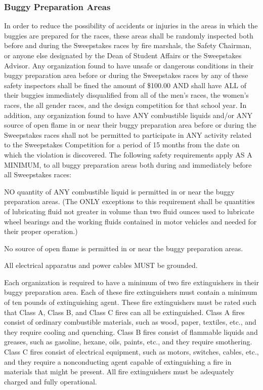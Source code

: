 \subsubsection{Buggy Preparation Areas}
\label{subsec:Buggy Prep}

	In order to reduce the possibility of accidents or injuries in the areas in which the buggies are prepared for the races, these areas shall be randomly inspected both before and during the Sweepstakes races by fire marshals, the Safety Chairman, or anyone else designated by the Dean of Student Affairs or the Sweepstakes Advisor. Any organization found to have unsafe or dangerous conditions in their buggy preparation area before or during the Sweepstakes races by any of these safety inspectors shall be fined the amount of \$100.00 AND shall have ALL of their buggies immediately disqualified from all of the men's races, the women's races, the all gender races, and the design competition for that school year. In addition, any organization found to have ANY combustible liquids and/or ANY source of open flame in or near their buggy preparation area before or during the Sweepstakes races shall not be permitted to participate in ANY activity related to the Sweepstakes Competition for a period of 15 months from the date on which the violation is discovered. The following safety requirements apply AS A MINIMUM, to all buggy preparation areas both during and immediately before all Sweepstakes races:

	NO quantity of ANY combustible liquid is permitted in or near the buggy preparation areas. (The ONLY exceptions to this requirement shall be quantities of lubricating fluid not greater in volume than two fluid ounces used to lubricate wheel bearings and the working fluids contained in motor vehicles and needed for their proper operation.)

	No source of open flame is permitted in or near the buggy preparation areas.

	All electrical apparatus and power cables MUST be grounded.

	Each organization is required to have a minimum of two fire extinguishers in their buggy preparation area. Each of these fire extinguishers must contain a minimum of ten pounds of extinguishing agent. These fire extinguishers must be rated such that Class A, Class B, and Class C fires can all be extinguished. Class A fires consist of ordinary combustible materials, such as wood, paper, textiles, etc., and they require cooling and quenching. Class B fires consist of flammable liquids and greases, such as gasoline, hexane, oils, paints, etc., and they require smothering. Class C fires consist of electrical equipment, such as motors, switches, cables, etc., and they require a nonconducting agent capable of extinguishing a fire in materials that might be present. All fire extinguishers must be adequately charged and fully operational.

